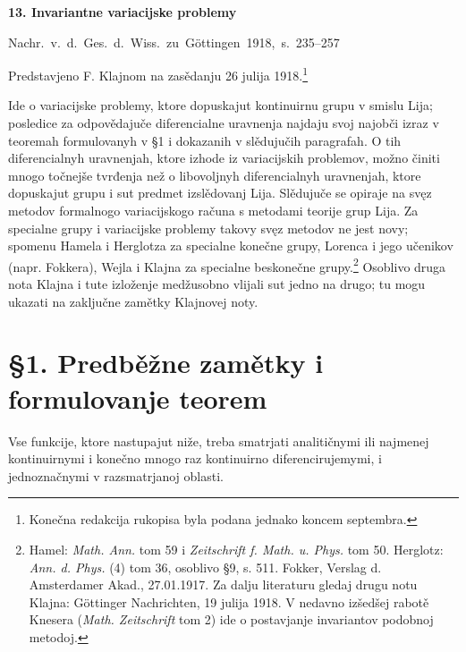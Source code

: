 \documentclass[11pt]{article}
\begin{document}

\begin{center}
{\Large\bfseries 13. Invariantne variacijske problemy}\par
\vspace{1.5em}
\mbox{Nachr. v. d. Ges. d. Wiss. zu Göttingen 1918, s. 235--257}
\end{center}

\vspace{3em}
\begin{center}
Predstavjeno F. Klajnom na zasědanju 26 julija 1918.\footnote{Konečna redakcija rukopisa byla podana jednako koncem septembra.}
\end{center}

Ide o variacijske problemy, ktore dopuskajut kontinuirnu grupu v smislu Lija; posledice za odpovědajuče diferencialne uravnenja najdaju svoj najobči izraz v teoremah formulovanyh v \S{}1 i dokazanih v slědujučih paragrafah. O tih diferencialnyh uravnenjah, ktore izhode iz variacijskih problemov, možno činiti mnogo točnejše tvrđenja než o libovoljnyh diferencialnyh uravnenjah, ktore dopuskajut grupu i sut predmet izslědovanj Lija. Slědujuče se opiraje na svęz metodov formalnogo variacijskogo računa s metodami teorije grup Lija. Za specialne grupy i variacijske problemy takovy svęz metodov ne jest novy; spomenu Hamela i Herglotza za specialne konečne grupy, Lorenca i jego učenikov (napr. Fokkera), Wejla i Klajna za specialne beskonečne grupy.\footnote{Hamel: \emph{Math. Ann.} tom 59 i \emph{Zeitschrift f. Math. u. Phys.} tom 50. Herglotz: \emph{Ann. d. Phys.} (4) tom 36, osoblivo \S{}9, s. 511. Fokker, Verslag d. Amsterdamer Akad., 27.01.1917. Za dalju literaturu gledaj drugu notu Klajna: Göttinger Nachrichten, 19 julija 1918. V nedavno izšedšej rabotě Knesera (\emph{Math. Zeitschrift} tom 2) ide o postavjanje invariantov podobnoj metodoj.} Osoblivo druga nota Klajna i tute izloženje medžusobno vlijali sut jedno na drugo; tu mogu ukazati na zaključne zamětky Klajnovej noty.

\section*{\S{}1. Predběžne zamětky i formulovanje teorem}

Vse funkcije, ktore nastupajut niže, treba smatrjati analitičnymi ili najmenej kontinuirnymi i konečno mnogo raz kontinuirno diferencirujemymi, i jednoznačnymi v razsmatrjanoj oblasti.
\end{document}
